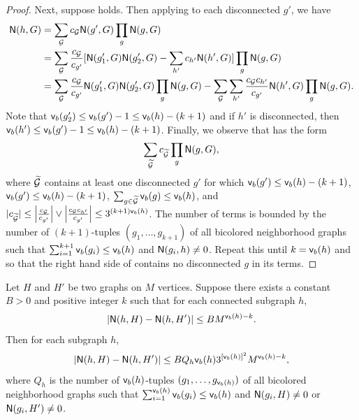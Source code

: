 \begin{proof}
Next, suppose  holds. Then applying  to each disconnected $ g' $, we have
\begin{align}
{\mathsf{N}}(h, G) & = \sum_{{\mathcal{G}}} c_{{\mathcal{G}}} {\mathsf{N}}(g', G)\prod_{g}{\mathsf{N}}(g, G) \nonumber \\
& = \sum_{{\mathcal{G}}} \frac{c_{{\mathcal{G}}}}{c_{g'}} [{\mathsf{N}}(g'_1, G){\mathsf{N}}(g'_2, G) - \sum_{h'} c_{h'}{\mathsf{N}}(h', G)]\prod_{g}{\mathsf{N}}(g, G) \nonumber \\
& = \sum_{{\mathcal{G}}} \frac{c_{{\mathcal{G}}}}{c_{g'}} {\mathsf{N}}(g'_1, G){\mathsf{N}}(g'_2, G)\prod_{g}{\mathsf{N}}(g, G) - \sum_{{\mathcal{G}}}\sum_{h'} \frac{c_{{\mathcal{G}}}c_{h'}}{c_{g'}}{\mathsf{N}}(h', G)\prod_{g}{\mathsf{N}}(g, G). \label{eq:poly-rep2}
\end{align}
Note that $ {\mathsf{v}}_b(g'_2) \leq {\mathsf{v}}_b(g') -1 \leq {\mathsf{v}}_b(h)-(k+1) $ and if $ h' $ is disconnected, then $ {\mathsf{v}}_{b}(h') \leq {\mathsf{v}}_b(g') -1 \leq {\mathsf{v}}_b(h)-(k+1) $. Finally, we observe that  has the form
\begin{equation} \label{eq:poly-rep}
\sum_{\widetilde{{\mathcal{G}}}} c_{\widetilde{{\mathcal{G}}}} \prod_{g}{\mathsf{N}}(g, G),
\end{equation}
where $ \widetilde{{\mathcal{G}}} $ contains at least one disconnected $ g' $ for which $ {\mathsf{v}}_b(g') \leq {\mathsf{v}}_b(h)-(k+1) $, $ {\mathsf{v}}_b(g') \leq {\mathsf{v}}_b(h)-(k+1) $, $ \sum_{g\in \widetilde{{\mathcal{G}}}} {\mathsf{v}}_b(g) \leq {\mathsf{v}}_b(h) $, and $ |c_{\widetilde{{\mathcal{G}}}}| \leq \left|\frac{c_{{\mathcal{G}}}}{c_{g'}}\right| \vee \left|\frac{c_{{\mathcal{G}}}c_{h'}}{c_{g'}} \right| \leq 3^{(k+1){\mathsf{v}}_b(h)} $. The number of terms is bounded by the number of $ (k+1) $-tuples $ (g_1, \dots, g_{k+1}) $ of all bicolored neighborhood graphs such that $ \sum_{i=1}^{k+1} {\mathsf{v}}_b(g_i) \leq {\mathsf{v}}_b(h) $ and $ {\mathsf{N}}(g_i, h) \neq 0 $. Repeat this until $ k = {\mathsf{v}}_b(h) $ and so that the right hand side of  contains no disconnected $ g $ in its terms.
\end{proof}

\begin{lemma} \label{lmm:subgraph_bound}
Let $ H $ and $ H' $ be two graphs on $ M $ vertices. Suppose there exists a constant $ B > 0 $ and positive integer $ k $ such that for each connected subgraph $ h $,
\begin{equation*}
|{\mathsf{N}}(h, H)-{\mathsf{N}}(h, H')|  \leq BM^{{\mathsf{v}}_{b}(h)-k}.
\end{equation*}
Then for each subgraph $ h $,
\begin{equation*}
|{\mathsf{N}}(h, H)-{\mathsf{N}}(h, H')|  \leq BQ_h{\mathsf{v}}_{b}(h)3^{[{\mathsf{v}}_{b}(h)]^2}M^{{\mathsf{v}}_{b}(h)-k},
\end{equation*}
where $ Q_h $ is the number of $ {\mathsf{v}}_{b}(h) $-tuples $ (g_1, \dots, g_{{\mathsf{v}}_{b}(h)}) $ of all bicolored neighborhood graphs such that $ \sum_{i=1}^{{\mathsf{v}}_{b}(h)} {\mathsf{v}}_b(g_i) \leq {\mathsf{v}}_{b}(h) $ and $ {\mathsf{N}}(g_i, H) \neq 0 $ or $ {\mathsf{N}}(g_i, H') \neq 0 $.
\end{lemma}

